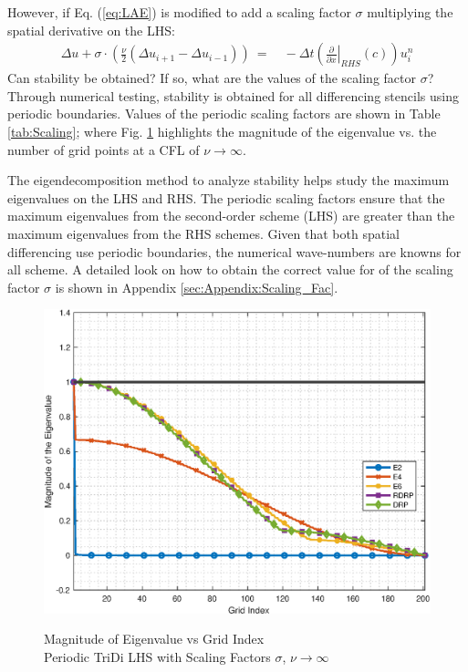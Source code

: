 \documentclass[conf]{new-aiaa}
\begin{document}
However, if Eq. (\ref{eq:LAE}) is modified to add a scaling factor $\sigma$ multiplying the spatial derivative on the LHS:
\begin{equation}
	\begin{split}
		\label{eq:LAE_Scaling}
  			\Delta{u}+\sigma\cdot\left(\frac{\nu}{2}\left(\Delta{u_{i+1}}-\Delta{u_{i-1}} \right)\right)~=&~-\Delta{t}\left(\left.\frac{\partial}{\partial{x}}\right|_{RHS}\left(c\right)\right) {u}_i^{n}
	\end{split}
\end{equation}
Can stability be obtained? If so, what are the values of the scaling factor $\sigma$? 
Through numerical testing, stability is obtained for all differencing stencils using periodic boundaries. 
Values of the periodic scaling factors are shown in Table \ref{tab:Scaling}; where Fig. \ref{fig:index_vs_mag_Scaling} highlights the magnitude of the eigenvalue vs. the number of grid points at a CFL of $\nu\to\infty$. 


The eigendecomposition method to analyze stability helps study the maximum eigenvalues on the LHS and RHS. 
The periodic scaling factors ensure that the maximum eigenvalues from the second-order scheme (LHS) are greater than the maximum eigenvalues from the RHS schemes. 
Given that both spatial differencing use periodic boundaries, the numerical wave-numbers are knowns for all scheme. 
A detailed look on how to obtain the correct value for of the scaling factor $\sigma$ is shown in Appendix \ref{sec:Appendix:Scaling_Fac}. 

\begin{figure}[hbtp!]
	\centering
	{\includegraphics[width=.7\textwidth]{Figures/index_vs_mag_ScaleFactor_Periodic}}
	\caption{Magnitude of Eigenvalue vs Grid Index \\
	Periodic TriDi LHS with Scaling Factors $\sigma$, $\nu\to\infty$}
	\label{fig:index_vs_mag_Scaling}
\end{figure}
\end{document}
